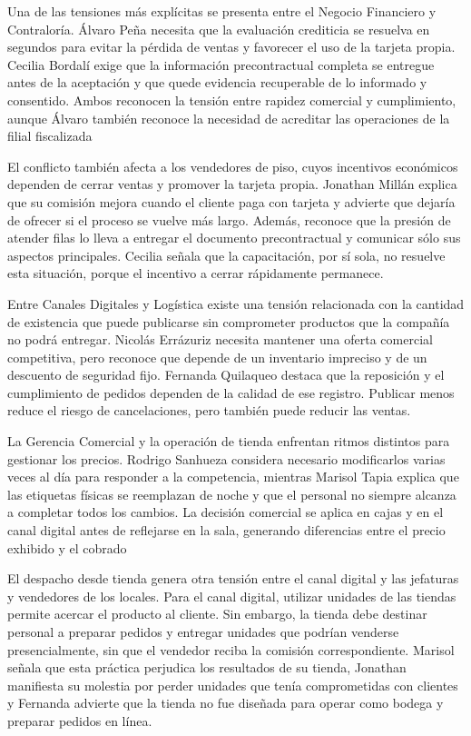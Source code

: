 \documentclass[11pt]{article}
\begin{document}
Una de las tensiones más explícitas se presenta entre el Negocio Financiero y Contraloría. Álvaro Peña necesita que la evaluación crediticia se resuelva en segundos para evitar la pérdida de ventas y favorecer el uso de la tarjeta propia. Cecilia Bordalí exige que la información precontractual completa se entregue antes de la aceptación y que quede evidencia recuperable de lo informado y consentido. Ambos reconocen la tensión entre rapidez comercial y cumplimiento, aunque Álvaro también reconoce la necesidad de acreditar las operaciones de la filial fiscalizada

El conflicto también afecta a los vendedores de piso, cuyos incentivos económicos dependen de cerrar ventas y promover la tarjeta propia. Jonathan Millán explica que su comisión mejora cuando el cliente paga con tarjeta y advierte que dejaría de ofrecer si el proceso se vuelve más largo. Además, reconoce que la presión de atender filas lo lleva a entregar el documento precontractual y comunicar sólo sus aspectos principales. Cecilia señala que la capacitación, por sí sola, no resuelve esta situación, porque el incentivo a cerrar rápidamente permanece.

Entre Canales Digitales y Logística existe una tensión relacionada con la cantidad de existencia que puede publicarse sin comprometer productos que la compañía no podrá entregar. Nicolás Errázuriz necesita mantener una oferta comercial competitiva, pero reconoce que depende de un inventario impreciso y de un descuento de seguridad fijo. Fernanda Quilaqueo destaca que la reposición y el cumplimiento de pedidos dependen de la calidad de ese registro. Publicar menos reduce el riesgo de cancelaciones, pero también puede reducir las ventas.

La Gerencia Comercial y la operación de tienda enfrentan ritmos distintos para gestionar los precios. Rodrigo Sanhueza considera necesario modificarlos varias veces al día para responder a la competencia, mientras Marisol Tapia explica que las etiquetas físicas se reemplazan de noche y que el personal no siempre alcanza a completar todos los cambios. La decisión comercial se aplica en cajas y en el canal digital antes de reflejarse en la sala, generando diferencias entre el precio exhibido y el cobrado

El despacho desde tienda genera otra tensión entre el canal digital y las jefaturas y vendedores de los locales. Para el canal digital, utilizar unidades de las tiendas permite acercar el producto al cliente. Sin embargo, la tienda debe destinar personal a preparar pedidos y entregar unidades que podrían venderse presencialmente, sin que el vendedor reciba la comisión correspondiente. Marisol señala que esta práctica perjudica los resultados de su tienda, Jonathan manifiesta su molestia por perder unidades que tenía comprometidas con clientes y Fernanda advierte que la tienda no fue diseñada para operar como bodega y preparar pedidos en línea.
\end{document}
